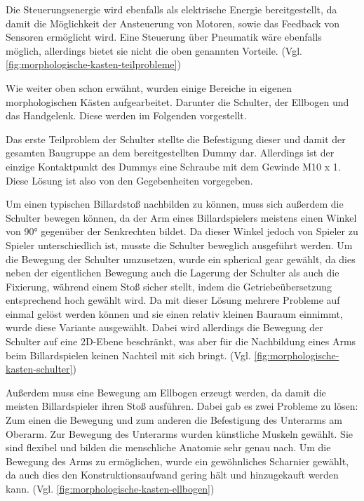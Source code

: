 	Die Steuerungsenergie wird ebenfalls als elektrische Energie bereitgestellt, da damit die Möglichkeit der Ansteuerung von Motoren, sowie das Feedback von Sensoren ermöglicht wird. Eine Steuerung über Pneumatik wäre ebenfalls möglich, allerdings bietet sie nicht die oben genannten Vorteile. (Vgl. \cref{fig:morphologische-kasten-teilprobleme}) \par\medskip
	
	Wie weiter oben schon erwähnt, wurden einige Bereiche in eigenen morphologischen Kästen aufgearbeitet. Darunter die Schulter, der Ellbogen und das Handgelenk. Diese werden im Folgenden vorgestellt. \par\medskip
	
	Das erste Teilproblem der Schulter stellte die Befestigung dieser und damit der gesamten Baugruppe an dem bereitgestellten Dummy dar. Allerdings ist der einzige Kontaktpunkt des Dummys eine Schraube mit dem Gewinde M10 x 1. Diese Lösung ist also von den Gegebenheiten vorgegeben. \par\medskip
	
	Um einen typischen Billardstoß nachbilden zu können, muss sich außerdem die Schulter bewegen können, da der Arm eines Billardspielers meistens einen Winkel von 90° gegenüber der Senkrechten bildet. Da dieser Winkel jedoch von Spieler zu Spieler unterschiedlich ist, musste die Schulter beweglich ausgeführt werden. Um die Bewegung der Schulter umzusetzen, wurde ein spherical gear gewählt, da dies neben der eigentlichen Bewegung auch die Lagerung der Schulter als auch die Fixierung, während einem Stoß sicher stellt, indem die Getriebeübersetzung entsprechend hoch gewählt wird. Da mit dieser Lösung mehrere Probleme auf einmal gelöst werden können und sie einen relativ kleinen Bauraum einnimmt, wurde diese Variante ausgewählt. Dabei wird allerdings die Bewegung der Schulter auf eine 2D-Ebene beschränkt, was aber für die Nachbildung eines Arms beim Billardspielen keinen Nachteil mit sich bringt. (Vgl. \cref{fig:morphologische-kasten-schulter}) \par\medskip
	
	Außerdem muss eine Bewegung am Ellbogen erzeugt werden, da damit die meisten Billardspieler ihren Stoß ausführen. Dabei gab es zwei Probleme zu lösen: Zum einen die Bewegung und zum anderen die Befestigung des Unterarms am Oberarm. Zur Bewegung des Unterarms wurden künstliche Muskeln gewählt. Sie sind flexibel und bilden die menschliche Anatomie sehr genau nach. Um die Bewegung des Arms zu ermöglichen, wurde ein gewöhnliches Scharnier gewählt, da auch dies den Konstruktionsaufwand gering hält und hinzugekauft werden kann. (Vgl. \cref{fig:morphologische-kasten-ellbogen}) \par\medskip
	
